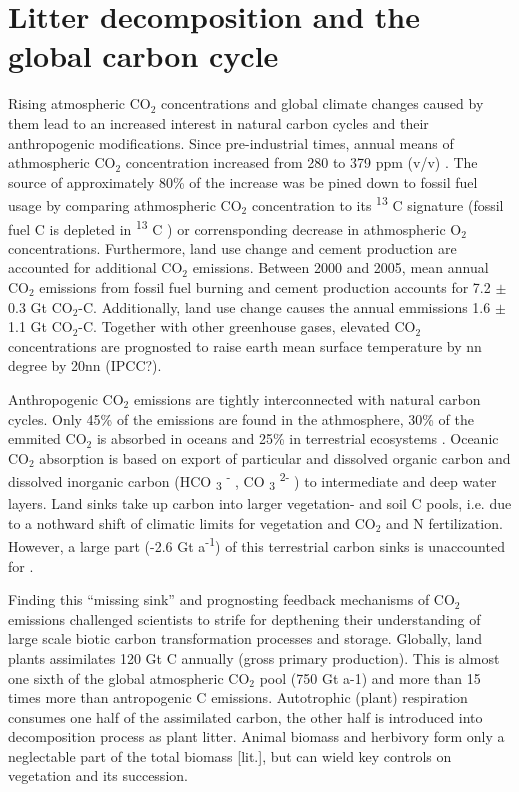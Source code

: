 
\section{Litter decomposition and the global carbon cycle}

Rising atmospheric CO$_{2}$ concentrations and global climate changes caused by them \citep{IPCC2007pt1ch1} lead to an increased interest in natural carbon cycles and their anthropogenic modifications. Since pre-industrial times, annual means of athmospheric CO$_{2}$ concentration increased from 280 to 379 ppm (v/v) \citep{IPCC2007pt1ch1}. The source of approximately 80\% of the increase was be pined down to fossil fuel usage by comparing athmospheric CO$_{2}$ concentration to its \textsuperscript{13} C signature (fossil fuel C is depleted in \textsuperscript{13} C ) or corrensponding decrease in athmospheric O$_{2}$ concentrations\citep{IPCC2007pt1ch1}. Furthermore, land use change and cement production are accounted for additional CO$_{2}$ emissions. Between 2000 and 2005, mean annual CO$_{2}$ emissions from fossil fuel burning and cement production accounts for 7.2 $\pm$ 0.3 Gt CO$_{2}$-C. Additionally, land use change causes the annual emmissions 1.6 $\pm$ 1.1 Gt CO$_{2}$-C. Together with other greenhouse gases, elevated CO$_{2}$ concentrations are prognosted to raise earth mean surface temperature by nn degree by 20nn (IPCC?).

Anthropogenic CO$_{2}$ emissions are tightly interconnected with natural carbon cycles. Only 45\% of the emissions are found in the athmosphere, 30\% of the emmited CO$_{2}$ is absorbed in oceans and 25\% in terrestrial ecosystems . Oceanic CO$_{2}$ absorption is based on export of particular and dissolved organic carbon and dissolved inorganic carbon (HCO \textsubscript{3} \textsuperscript{-} , CO \textsubscript{3} \textsuperscript{2-} ) to intermediate and deep water layers. Land sinks take up carbon into larger vegetation- and soil C pools, i.e. due to a nothward shift of climatic limits for vegetation and CO$_{2}$ and N fertilization. However, a large part (-2.6 Gt a\textsuperscript{-1}) of this terrestrial carbon sinks is unaccounted for \citep[p. 515]{IPCC2007pt1ch7}. 

Finding this ``missing sink'' and prognosting feedback mechanisms of CO$_{2}$ emissions challenged scientists to strife for depthening their understanding of large scale biotic carbon transformation processes and storage. Globally, land plants assimilates 120 Gt C annually (gross primary production). This is almost one sixth of the global atmospheric CO$_{2}$ pool (750 Gt a-1) and more than 15 times more than antropogenic C emissions. Autotrophic (plant) respiration consumes one half of the assimilated carbon, the other half is introduced into decomposition process as plant litter. Animal biomass and herbivory form only a neglectable part of the total biomass [lit.], but can wield key controls on vegetation and its succession.

